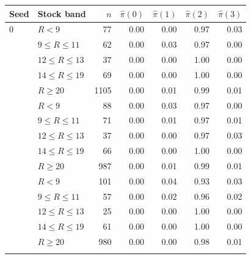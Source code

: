 \begin{tabular}{llrrrrr}
\toprule
Seed & Stock band & $n$ & $\hat\pi(0)$ & $\hat\pi(1)$ & $\hat\pi(2)$ & $\hat\pi(3)$ \\
\midrule
0 & $R<9$ & 77 & 0.00 & 0.00 & 0.97 & 0.03 \\
 & $9\le R\le 11$ & 62 & 0.00 & 0.03 & 0.97 & 0.00 \\
 & $12\le R\le 13$ & 37 & 0.00 & 0.00 & 1.00 & 0.00 \\
 & $14\le R\le 19$ & 69 & 0.00 & 0.00 & 1.00 & 0.00 \\
 & $R\ge 20$ & 1105 & 0.00 & 0.01 & 0.99 & 0.01 \\
\addlinespace
1 & $R<9$ & 88 & 0.00 & 0.03 & 0.97 & 0.00 \\
 & $9\le R\le 11$ & 71 & 0.00 & 0.01 & 0.97 & 0.01 \\
 & $12\le R\le 13$ & 37 & 0.00 & 0.00 & 0.97 & 0.03 \\
 & $14\le R\le 19$ & 66 & 0.00 & 0.00 & 1.00 & 0.00 \\
 & $R\ge 20$ & 987 & 0.00 & 0.01 & 0.99 & 0.01 \\
\addlinespace
2 & $R<9$ & 101 & 0.00 & 0.04 & 0.93 & 0.03 \\
 & $9\le R\le 11$ & 57 & 0.00 & 0.02 & 0.96 & 0.02 \\
 & $12\le R\le 13$ & 25 & 0.00 & 0.00 & 1.00 & 0.00 \\
 & $14\le R\le 19$ & 61 & 0.00 & 0.00 & 1.00 & 0.00 \\
 & $R\ge 20$ & 980 & 0.00 & 0.00 & 0.98 & 0.01 \\
\addlinespace
\bottomrule
\end{tabular}
